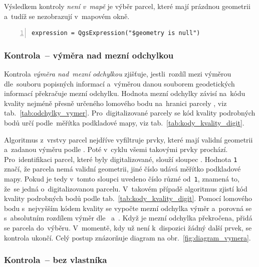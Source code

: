 Výsledkem kontroly \textit{není v~mapě} je výběr parcel, které mají
prázdnou geometrii a~tudíž se nezobrazují v~mapovém okně.

{\scriptsize
\begin{lstlisting}[style=python, caption={Kontrola \textit{není
v~mapě}~– vzorec pro~výběr prvků}, captionpos=b,
label=kontrola_mapa_kod, backgroundcolor = \color{light-gray},
numbers=left]
expression = QgsExpression("$geometry is null")
\end{lstlisting}}

\subsubsection{Kontrola~– výměra nad mezní odchylkou}
\label{kontrola_vymera}

Kontrola \textit{výměra nad~mezní odchylkou} zjišťuje, jestli~rozdíl
mezi výměrou dle~souboru popisných informací a~výměrou danou souborem
geodetických informací překračuje mezní odchylku. Hodnota mezní
odchylky závisí na~kódu kvality nejméně přesně určeného lomového bodu
na~hranici parcely \citep{vyhlaska_357}, viz
tab.~\ref{tab:odchylky_vymer}. Pro~digitalizované parcely se kód
kvality podrobných bodů určí podle~měřítka podkladové mapy, viz
tab.~\ref{tab:kody_kvality_digit}.

Algoritmus z~vrstvy parcel nejdříve vyfiltruje prvky, které mají
validní geometrii a~zadanou výměru podle . Poté v~cyklu všemi
takovými prvky prochází. Pro~identifikaci parcel, které byly
digitalizované, slouží sloupec
\texttt{}. Hodnota \texttt{1} značí,
že parcela nemá validní geometrii, jiné číslo udává měřítko podkladové
mapy. Pokud je tedy v~tomto sloupci uvedeno číslo různé od~\texttt{1},
znamená to, že~se jedná o~digitalizovanou parcelu. V~takovém případě
algoritmus zjistí kód kvality podrobných bodů podle
tab.~\ref{tab:kody_kvality_digit}. Pomocí lomového bodu s~nejvyšším
kódem kva\-lity se vypočte mezní odchylka výměr a~porovná se
s~absolutním rozdílem výměr dle~ a~. Když je mezní
odchylka překročena, přidá se parcela do~výběru. V~momentě, kdy už není
k~dispozici žádný další prvek, se kontrola ukončí. Celý postup
znázorňuje diagram na obr.~\ref{fig:diagram_vymera}.

\subsubsection{Kontrola~– bez vlastníka}
\label{kontrola_bez_vlastnika}

